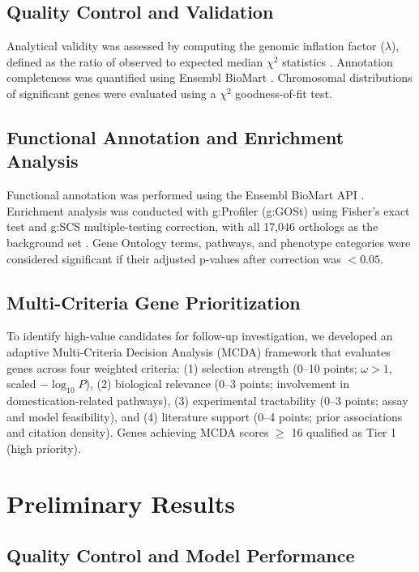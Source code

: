\documentclass[11pt,letterpaper]{article}
\begin{document}
\subsection{Quality Control and Validation}
Analytical validity was assessed by computing the genomic inflation factor ($\lambda$), defined as the ratio of observed to expected median $\chi^2$ statistics \citep{Devlin1999}. Annotation completeness was quantified using Ensembl BioMart \citep{Kinsella2011}. Chromosomal distributions of significant genes were evaluated using a $\chi^2$ goodness-of-fit test.

\subsection{Functional Annotation and Enrichment Analysis}
Functional annotation was performed using the Ensembl BioMart API \citep{Kinsella2011}. Enrichment analysis was conducted with g:Profiler (g:GOSt) using Fisher's exact test and g:SCS multiple-testing correction, with all 17{,}046 orthologs as the background set \citep{Raudvere2019}. Gene Ontology terms, pathways, and phenotype categories were considered significant if their adjusted p-values after correction was $<0.05$.

\subsection{Multi-Criteria Gene Prioritization}
To identify high-value candidates for follow-up investigation, we developed an adaptive Multi-Criteria Decision Analysis (MCDA) framework that evaluates genes across four weighted criteria: (1) selection strength (0--10 points; $\omega > 1$, scaled $-\log_{10} P$), (2) biological relevance (0--3 points; involvement in domestication-related pathways), (3) experimental tractability (0--3 points; assay and model feasibility), and (4) literature support (0--4 points; prior associations and citation density). Genes achieving MCDA scores $\geq$ 16 qualified as Tier 1 (high priority). 

\section{Preliminary Results}

\subsection{Quality Control and Model Performance}
\end{document}
